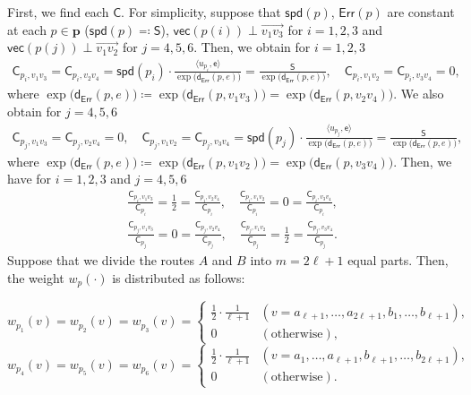 \documentclass{article}
\numberwithin{equation}{section}
\theoremstyle{definition}
\newcommand{\derr}{\mathsf{d}_{\mathsf{Err}}}
\newcommand{\ee}{\mathsf{e}}
\newcommand{\cc}{\mathsf{C}}
\newcommand{\err}{\mathsf{Err}}
\newcommand{\vect}{\mathsf{vec}}
\newcommand{\spd}{\mathsf{spd}}
\def\:={\coloneqq} %
\begin{document}
First, we find each $\cc$.
For simplicity, suppose that $\spd(p)$, $\err(p)$ are constant at each $p\in\mathbf{p}$ ($\spd(p)\eqqcolon\mathsf{S}$), $\vect(p(i))\perp\overrightarrow{v_1v_3}$ for $i=1,2,3$ and $\vect(p(j))\perp\overrightarrow{v_1v_2}$ for $j=4,5,6$.
Then, we obtain for $i=1,2,3$
\begin{align*}
    \cc_{p_i,v_1v_3} = \cc_{p_i,v_2v_4} 
    = \spd(p_i)\cdot\frac{\langle u_{p_i},\ee \rangle}{\exp\big(\derr(p,e)\big)} 
    = \frac{\mathsf{S}}{\exp\big(\derr(p,e)\big)}, \quad
    \cc_{p_i,v_1v_2} = \cc_{p_i,v_3v_4} = 0,
\end{align*}
where $\exp\big(\derr(p,e)\big)\:=\exp\big(\derr(p,v_1v_3)\big)=\exp\big(\derr(p,v_2v_4)\big)$.
We also obtain for $j=4,5,6$
\begin{align*}
    \cc_{p_j,v_1v_3} = \cc_{p_j,v_2v_4} = 0, \quad
    \cc_{p_j,v_1v_2} = \cc_{p_j,v_3v_4} 
    = \spd(p_j)\cdot\frac{\langle u_{p_j},\ee \rangle}{\exp\big(\derr(p,e)\big)}
    = \frac{\mathsf{S}}{\exp\big(\derr(p,e)\big)},
\end{align*}
where $\exp\big(\derr(p,e)\big)\:=\exp\big(\derr(p,v_1v_2)\big)=\exp\big(\derr(p,v_3v_4)\big)$.
Then, we have for $i=1,2,3$ and $j=4,5,6$
\begin{align*}
    \frac{\cc_{p_i,v_1v_3}}{\cc_{p_i}} = \frac{1}{2} = \frac{\cc_{p_i,v_2v_4}}{\cc_{p_i}}, \quad
    \frac{\cc_{p_i,v_1v_2}}{\cc_{p_i}} = 0 = \frac{\cc_{p_i,v_3v_4}}{\cc_{p_i}}, \\
    \frac{\cc_{p_j,v_1v_3}}{\cc_{p_j}} = 0 = \frac{\cc_{p_j,v_2v_4}}{\cc_{p_j}}, \quad
    \frac{\cc_{p_j,v_1v_2}}{\cc_{p_j}} = \frac{1}{2} = \frac{\cc_{p_j,v_3v_4}}{\cc_{p_j}}.
\end{align*}
Suppose that we divide the routes $A$ and $B$ into $m=2\ell+1$ equal parts.
Then, the weight $w_p(\cdot)$ is distributed as follows:
\begin{center} \vspace{-6mm}
\[ w_{p_1}(v) = w_{p_2}(v) = w_{p_3}(v) = 
\begin{cases}
\frac{1}{2}\cdot\frac{1}{\ell+1} & (v=a_{\ell+1},\ldots,a_{2\ell+1},b_1,\ldots,b_{\ell+1}),   \\
0 & (\text{otherwise}), 
\end{cases}\]
\[ w_{p_4}(v) = w_{p_5}(v) = w_{p_6}(v) = 
\begin{cases}
\frac{1}{2}\cdot\frac{1}{\ell+1} & (v=a_1,\ldots,a_{\ell+1},b_{\ell+1},\ldots,b_{2\ell+1}),   \\
0 & (\text{otherwise}).
\end{cases}\]
\end{center} 
\end{document}
